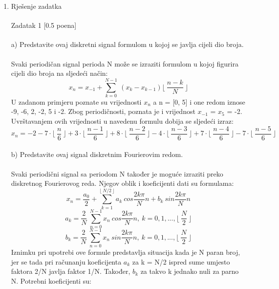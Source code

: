\documentclass[12pt]{article}
\begin{document}
    
	\begin{enumerate}
		\item Rješenje zadatka \\
		\\
		Zadatak 1 [0.5 poena] \\
		\\
		a) Predstavite ovaj diskretni signal formulom u kojoj se javlja cijeli dio broja.
		\\
		\\
		Svaki periodičan signal perioda N može se izraziti formulom u kojoj figurira cijeli dio broja na sljedeći način: \\
		\begin{equation*}
		    x_n = x_{-1} + \sum_{k =0}^{N-1}~(x_k - x_{k-1}) \lfloor~\frac{n - k }{N}~\rfloor
		\end{equation*}
		U zadanom primjeru poznate su vrijednosti $x_n$ a n = [0, 5] i one redom iznose -9, -6, 2, -2, 5 i -2. Zbog periodičnosti, poznata je i vrijednost $x_{-1}$ = $x_5$ = -2. Uvrštavanjem ovih vrijednosti u navedenu formulu dobija se sljedeći izraz:
		\begin{equation*}
		    x_n = -2 -7 \cdot \lfloor~\frac{n }{6}~\rfloor + 3 \cdot \lfloor~\frac{n - 1}{6}~\rfloor + 8 \cdot \lfloor~\frac{n - 2}{6}~\rfloor - 4 \cdot \lfloor~\frac{n - 3}{6}~\rfloor + 7 \cdot \lfloor~\frac{n - 4}{6}~\rfloor - 7 \cdot \lfloor~\frac{n - 5}{6}~\rfloor
		\end{equation*}
		\\
		b) Predstavite ovaj signal diskretnim Fourierovim redom.
		\\
		\\
		Svaki periodični signal sa periodom N također je moguće izraziti preko diskretnog Fourierovog reda. Njegov oblik i koeficijenti dati su formulama:
		\begin{equation*}
		    x_n = \frac{a_0}{2} + \sum_{k = 1}^{\lfloor~N/2~\rfloor} a_k~cos\frac{2k\pi}{N}n + b_k~sin\frac{2k\pi}{N}n
		\end{equation*}
		\begin{equation*}
		    a_k = \frac{2}{N}~\sum_{n = 0}^{N - 1} x_n~cos\frac{2k\pi}{N}n, ~ k = 0,1,...,\lfloor~\frac{N}{2}~\rfloor
		\end{equation*}
		\begin{equation*}
		    b_k = \frac{2}{N}~\sum_{n = 0}^{N - 1} x_n~sin\frac{2k\pi}{N}n, ~ k = 0,1,...,\lfloor~\frac{N}{2}~\rfloor
		\end{equation*}
		Iznimku pri upotrebi ove formule predstavlja situacija kada je N paran broj, jer se tada pri računanju koeficijenta $a_k$ za k = N/2 ispred sume umjesto faktora 2/N javlja faktor 1/N. Također, $b_k$ za takvo k jednako nuli za parno N. Potrebni koeficijenti su:

\end{enumerate}
\end{document}
